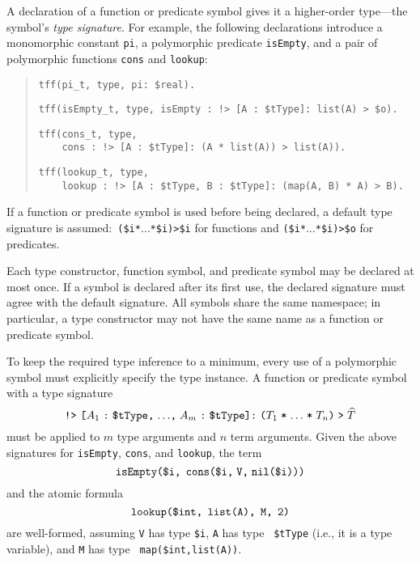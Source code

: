 A declaration of a function or predicate symbol gives it a higher-order
type---the symbol's {\em type signature}. For example, the following
declarations introduce a monomorphic constant {\tt pi}, a polymorphic predicate
{\tt isEmpty}, and a pair of polymorphic functions {\tt cons} and {\tt lookup}:
\begin{quote}
\verb+tff(pi_t, type, pi: $real).+
\par\smallskip
\verb+tff(isEmpty_t, type, isEmpty : !> [A : $tType]: list(A) > $o).+
\par\smallskip
\verb+tff(cons_t, type,+\\
\verb+    cons : !> [A : $tType]: (A * list(A)) > list(A)).+
\par\smallskip
\verb+tff(lookup_t, type,+\\
\verb+    lookup : !> [A : $tType, B : $tType]: (map(A, B) * A) > B).+
\end{quote}
If a function or predicate symbol is used before being declared, a
default type signature is assumed:\ {\tt (\$i\;*\;${\dots}$\;*\;\$i)\;>\;\$i}
for functions and {\tt (\$i\;*\;${\dots}$\;*\;\$i)\;>\;\$o} for predicates.

Each type constructor, function symbol, and predicate symbol may be declared at
most once. If a symbol is declared after its first use, the declared signature
must agree with the default signature. All symbols share the same namespace; in
particular, a type constructor may not have the same name as a function or
predicate symbol.


 To keep the required type
inference to a minimum, every use of a polymorphic symbol must explicitly
specify the type instance. A function or predicate symbol with a type signature
\[\hbox{{\tt !>} {\tt [$A_1$\;:\;\$tType,\;${\dots}$,\;$A_m$\;:\;\$tType]:\;%
($T_1$\;*\;${\dots}$\;*\;$T_n$)\;>\;$\widehat T$}}\]
must be applied to $m$ type arguments and $n$ term arguments. Given the above
signatures for {\tt isEmpty}, {\tt cons}, and {\tt lookup}, the term
\[\hbox{\tt isEmpty(\$i,\;\,cons(\$i,\;V,\;nil(\$i)))}\]
and the atomic formula
\[\hbox{\tt lookup(\$int,\;\,list(A),\;\,M,\;\,2)}\]
are well-formed, assuming {\tt V} has type {\tt \$i}, {\tt A} has type {\tt
\$tType} (i.e., it is a type variable), and {\tt M} has type {\tt
map(\$int,\;list(A))}.

